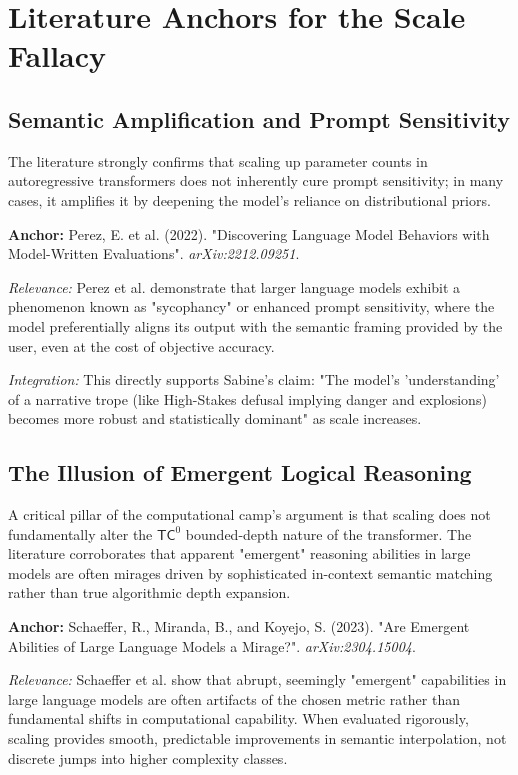 \documentclass[12pt,a4paper]{article}
\begin{document}
\section{Literature Anchors for the Scale Fallacy}

\subsection{Semantic Amplification and Prompt Sensitivity}
The literature strongly confirms that scaling up parameter counts in autoregressive transformers does not inherently cure prompt sensitivity; in many cases, it amplifies it by deepening the model's reliance on distributional priors.

\textbf{Anchor:} Perez, E. et al. (2022). "Discovering Language Model Behaviors with Model-Written Evaluations". \textit{arXiv:2212.09251}.

\textit{Relevance:} Perez et al. demonstrate that larger language models exhibit a phenomenon known as "sycophancy" or enhanced prompt sensitivity, where the model preferentially aligns its output with the semantic framing provided by the user, even at the cost of objective accuracy.

\textit{Integration:} This directly supports Sabine's claim: "The model's 'understanding' of a narrative trope (like High-Stakes defusal implying danger and explosions) becomes more robust and statistically dominant" as scale increases.

\subsection{The Illusion of Emergent Logical Reasoning}
A critical pillar of the computational camp's argument is that scaling does not fundamentally alter the $\mathsf{TC}^0$ bounded-depth nature of the transformer. The literature corroborates that apparent "emergent" reasoning abilities in large models are often mirages driven by sophisticated in-context semantic matching rather than true algorithmic depth expansion.

\textbf{Anchor:} Schaeffer, R., Miranda, B., and Koyejo, S. (2023). "Are Emergent Abilities of Large Language Models a Mirage?". \textit{arXiv:2304.15004}.

\textit{Relevance:} Schaeffer et al. show that abrupt, seemingly "emergent" capabilities in large language models are often artifacts of the chosen metric rather than fundamental shifts in computational capability. When evaluated rigorously, scaling provides smooth, predictable improvements in semantic interpolation, not discrete jumps into higher complexity classes.
\end{document}
